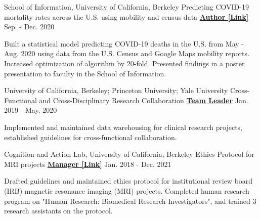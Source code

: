 \begin{cventries}

 \cventry
   {School of Information, University of California, Berkeley} %
   {Predicting COVID-19 mortality rates across the U.S. using mobility and census data} %
    {\href{https://drive.google.com/file/d/1l9TLGLmstkJsvOJQPxHe_f35b4fEkDU4/view}{\textbf{Author [Link]}}}
    {Sep. - Dec. 2020}
    {
      \begin{cvitems} %
      	\item {Built a statistical model predicting COVID-19 deaths in the U.S. from May - Aug. 2020 using data from the U.S. Census and Google Maps mobility reports. Increased optimization of algorithm by 20-fold. Presented findings in a poster presentation to faculty in the School of Information.}
      \end{cvitems}
    }
    
  \cventry 
    {University of California, Berkeley; Princeton University; Yale University} %
    {Cross-Functional and Cross-Disciplinary Research Collaboration}
    {\href{http://www.actcompthink.org/pubs/McDougleTsayEtAl_2021.pdf}{\textbf{Team Leader}}} %
    {Jan. 2019 - May. 2020} %
    {
      \begin{cvitems} %
      	\item {Implemented and maintained data warehousing for clinical research projects, established guidelines for cross-functional collaboration.}
      \end{cvitems}
    } 

  \cventry 
    {Cognition and Action Lab, University of California, Berkeley} %
    {Ethics Protocol for MRI projects}
    {\href{https://drive.google.com/file/d/1h66emU7-TRl-mSLZTEH01E3Qf5ZpEdbv/view?usp=sharing}{\textbf{Manager [Link]}}} %
    {Jan. 2018 - Dec. 2021} %
    {
      \begin{cvitems} %
      	\item {Drafted guidelines and maintained ethics protocol for institutional review board (IRB) magnetic resonance imaging (MRI) projects. Completed human research program on "Human Research: Biomedical Research Investigators", and trained 3 research assistants on the protocol.}
      \end{cvitems}
    }
    

\end{cventries}
